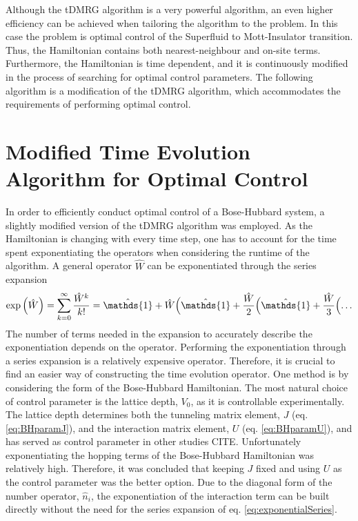 Although the tDMRG algorithm is a very powerful algorithm, an even higher efficiency can be achieved when tailoring the algorithm to the problem. In this case the problem is optimal control of the Superfluid to Mott-Insulator transition. Thus, the Hamiltonian contains both nearest-neighbour and on-site terms. Furthermore, the Hamiltonian is time dependent, and it is continuously modified in the process of searching for optimal control parameters. The following algorithm is a modification of the tDMRG algorithm, which accommodates the requirements of performing optimal control.


\section{Modified Time Evolution Algorithm for Optimal Control}
\label{sec:modTMDRG}
In order to efficiently conduct optimal control of a Bose-Hubbard system, a slightly modified version of the tDMRG algorithm was employed. As the Hamiltonian is changing with every time step, one has to account for the time spent exponentiating the operators when considering the runtime of the algorithm. A general operator $\hat{W}$ can be exponentiated through the series expansion
\begin{equation}
	\exp \left( \hat{W} \right) = \sum_{k = 0}^{\infty} \frac{\hat{W}^k}{k!} = \hat{\mathds{1}} + \hat{W} \Bigl(  \hat{\mathds{1}} + \frac{\hat{W}}{2} \Bigl( \hat{\mathds{1}} + \frac{\hat{W}}{3} \Bigl( \ldots
\label{eq:exponentialSeries}
\end{equation}
The number of terms needed in the expansion to accurately describe the exponentiation depends on the operator. Performing the exponentiation through a series expansion is a relatively expensive operator. Therefore, it is crucial to find an easier way of constructing the time evolution operator.
One method is by considering the form of the Bose-Hubbard Hamiltonian. The most natural choice of control parameter is the lattice depth, $V_0$, as it is controllable experimentally. The lattice depth determines both the tunneling matrix element, $J$ (eq. \eqref{eq:BHparamJ}), and the interaction matrix element, $U$ (eq. \eqref{eq:BHparamU}), and has served as control parameter in other studies CITE.   
Unfortunately exponentiating the hopping terms of the Bose-Hubbard Hamiltonian was relatively high. Therefore, it was concluded that keeping $J$ fixed and using $U$ as the control parameter was the better option. Due to the diagonal form of the number operator, $\hat{n}_i$, the exponentiation of the interaction term can be built directly without the need for the series expansion of eq. \eqref{eq:exponentialSeries}.
